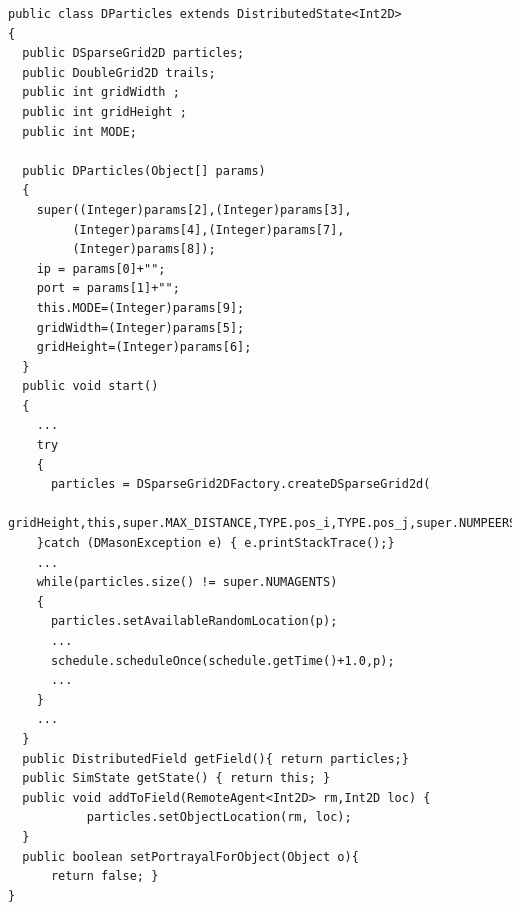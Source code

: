 \documentclass[12pt]{article}
\begin{document}
\medskip
{}
\begin{lstlisting}
public class DParticles extends DistributedState<Int2D>
{
  public DSparseGrid2D particles;
  public DoubleGrid2D trails;
  public int gridWidth ;
  public int gridHeight ;
  public int MODE;
	
  public DParticles(Object[] params)
  {
    super((Integer)params[2],(Integer)params[3],
         (Integer)params[4],(Integer)params[7],
         (Integer)params[8]);
    ip = params[0]+"";
    port = params[1]+"";
    this.MODE=(Integer)params[9];
    gridWidth=(Integer)params[5];
    gridHeight=(Integer)params[6];
  }
  public void start()
  {
    ...
    try 
    {
      particles = DSparseGrid2DFactory.createDSparseGrid2d(
      gridHeight,this,super.MAX_DISTANCE,TYPE.pos_i,TYPE.pos_j,super.NUMPEERS,MODE);
    }catch (DMasonException e) { e.printStackTrace();}
    ...
    while(particles.size() != super.NUMAGENTS)
    {
      particles.setAvailableRandomLocation(p);
      ...
      schedule.scheduleOnce(schedule.getTime()+1.0,p);
      ...
    }
	...
  }
  public DistributedField getField(){ return particles;}
  public SimState getState() { return this; }
  public void addToField(RemoteAgent<Int2D> rm,Int2D loc) {
           particles.setObjectLocation(rm, loc);
  }
  public boolean setPortrayalForObject(Object o){ 
      return false; }
}
\end{lstlisting}
\medskip
\end{document}
